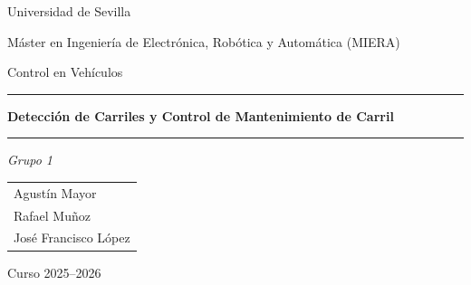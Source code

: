 \documentclass[12pt, a4paper]{article}
\begin{document}

\begin{titlepage}
    \centering
    \vspace*{2cm}
    {\large Universidad de Sevilla \par}
    {\large Máster en Ingeniería de Electrónica, Robótica y Automática (MIERA) \par}
    \vspace{1cm}
    {\large Control en Vehículos \par}
    \vspace{2cm}
    \hrule\vspace{0.5cm}
    {\Huge\bfseries Detección de Carriles y Control de Mantenimiento de Carril \par}
    \vspace{0.5cm}\hrule
    \vspace{2cm}
    {\large\itshape Grupo 1 \par}
    \vspace{1cm}
    \begin{tabular}{l}
        Agustín Mayor \\[4pt]
        Rafael Muñoz  \\[4pt]
        José Francisco López
    \end{tabular}
    \vfill
    {\large Curso 2025--2026 \par}
\end{titlepage}

\tableofcontents
\newpage

\begin{abstract}
    Este trabajo presenta el diseño e implementación de un sistema de \textit{Lane Keeping Assist} (LKA) para un vehículo autónomo simulado en \textit{CARLA Simulator} e integrado con \textit{ROS2 Humble} mediante contenedores Docker. El sistema consta de tres bloques principales: detección de líneas de carril mediante visión clásica con OpenCV y la transformada de Hough, diseño y sintonización de un controlador PID para mantener el vehículo centrado en el carril, y la integración de ambos módulos en un entorno de simulación realista donde se valida el funcionamiento completo. El código fuente, datasets e imágenes y vídeos demostrativos están disponibles en el repositorio público de GitHub: \url{https://github.com/JoseLopez36/Deteccion-Seguimiento-Carril}.
\end{abstract}

\newpage
\end{document}
